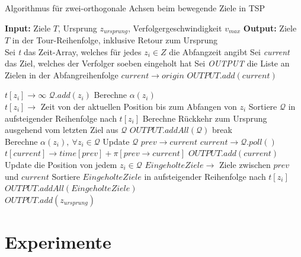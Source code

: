 \documentclass[german,version-2019-11]{uzl-thesis}
\begin{document}
\begin{minipage}{1\linewidth}
\begin{algorithm}[H]
\begin{algorithmic}
\caption{Algorithmus für zwei-orthogonale Achsen beim bewegende Ziele in TSP}
\label{alg:2OA.1}
\State \textbf{Input:} Ziele $T$, Ursprung $z_{ursprung}$, Verfolgergeschwindigkeit $v_{max}$
\State \textbf{Output:} Ziele $T$ in der Tour-Reihenfolge, inklusive Retour zum Ursprung\\

\State Sei \emph{t} das Zeit-Array, welches für jedes $z_i\in Z$ die Abfangzeit angibt
\State Sei \emph{current} das Ziel, welches der Verfolger soeben eingeholt hat
\State Sei \emph{OUTPUT} die Liste an Zielen in der Abfangreihenfolge
\State $current\rightarrow origin$
\State $OUTPUT.add(current)$
\State 

\State $t[z_i] \rightarrow \infty$
\State $\mathcal{Q}.add(z_i)$
\State Berechne $\alpha(z_i)$
\EndFor\\

\State $t[z_i] \rightarrow$ Zeit von der aktuellen Position bis zum Abfangen von $z_i$
\EndFor
\State Sortiere $\mathcal{Q}$ in aufsteigender Reihenfolge nach $t[z_i]$
\State Berechne Rückkehr zum Ursprung ausgehend vom letzten Ziel aus $\mathcal{Q}$
\State $OUTPUT.addAll(\mathcal{Q})$
\State break
\EndIf \\

\State Berechne $\alpha(z_i),~\forall z_i\in\mathcal{Q}$
\State Update $\mathcal{Q}$
\State $prev\rightarrow current$
\State $current \rightarrow \mathcal{Q}.poll()$
\State $t[current] \rightarrow time[prev] + \pi[prev\rightarrow current]$
\State $OUTPUT.add(current)$
\State Update die Position von jedem $z_i\in\mathcal{Q}$
\State $EingeholteZiele \rightarrow$ Ziele zwischen $prev$ und $current$
\State Sortiere $EingeholteZiele$ in aufsteigender Reihenfolge nach $t[z_i]$
\State $OUTPUT.addAll(EingeholteZiele)$
\EndWhile\\

\State $OUTPUT.add(z_{ursprung})$

\end{algorithmic}
\end{algorithm}
\end{minipage}


\chapter{Experimente}
\end{document}
